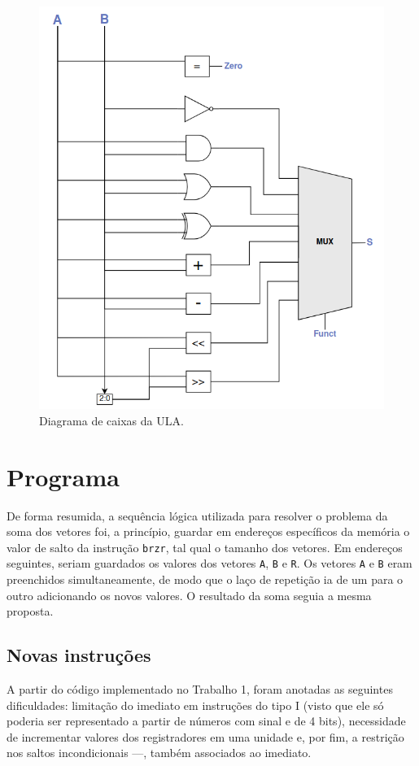 \documentclass[twocolumn, 11pt]{article}
\begin{document}
\begin{figure}[h]
    \centering
    \includegraphics[width=0.9\linewidth]{projeto_ula.png}
    \caption{Diagrama de caixas da ULA.}
    \label{fig:enter-label}
\end{figure}

\section{Programa}

De forma resumida, a sequência lógica utilizada para resolver o problema da soma dos vetores foi, a princípio, guardar em endereços específicos da memória o valor de salto da instrução \texttt{brzr}, tal qual o tamanho dos vetores. Em endereços seguintes, seriam guardados os valores dos vetores \texttt{A}, \texttt{B} e \texttt{R}. Os vetores \texttt{A} e \texttt{B} eram preenchidos simultaneamente, de modo que o laço de repetição ia de um para o outro adicionando os novos valores. O resultado da soma seguia a mesma proposta.

\subsection{Novas instruções}

A partir do código implementado no Trabalho 1, foram anotadas as seguintes dificuldades: limitação do imediato em instruções do tipo I (visto que ele só poderia ser representado a partir de números com sinal e de 4 bits), necessidade de incrementar valores dos registradores em uma unidade e, por fim, a restrição nos saltos incondicionais —, também associados ao imediato.
\end{document}

